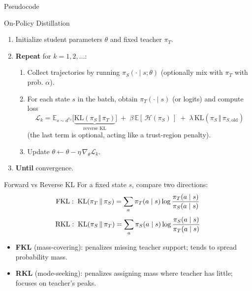 \documentclass[10pt,aspectratio=169]{beamer}
\begin{document}
\begin{frame}{Pseudocode}
\small
\begin{block}{On-Policy Distillation}
\begin{enumerate}
  \item Initialize student parameters $\theta$ and fixed teacher $\pi_T$.
  \item \textbf{Repeat} for $k=1,2,\dots$:
  \begin{enumerate}
    \item Collect trajectories by running $\pi_S(\cdot\mid s;\theta)$ (optionally mix with $\pi_T$ with prob. $\alpha$).
    \item For each state $s$ in the batch, obtain $\pi_T(\cdot\mid s)$ (or logits) and compute loss
    \[
      \mathcal{L}_k = \mathbb{E}_{s\sim d^{\pi_S}}\big[\underbrace{\mathrm{KL}(\pi_S\,\Vert\,\pi_T)}_{\text{reverse KL}}\big]
      \; + \; \beta\,\mathbb{E}[\,\mathcal{H}(\pi_S)\,] \; + \; \lambda\,\mathrm{KL}(\pi_S\,\Vert\,\pi_{S,\text{old}})
    \]
    (the last term is optional, acting like a trust-region penalty).
    \item Update $\theta \leftarrow \theta - \eta\,\nabla_\theta \mathcal{L}_k$.
  \end{enumerate}
  \item \textbf{Until} convergence.
\end{enumerate}
\end{block}
\end{frame}

\begin{frame}{Forward vs Reverse KL}
  For a fixed state $s$, compare two directions:
  \[\small
    \mathrm{FKL}:\; \mathrm{KL}(\pi_T\,\Vert\,\pi_S) 
    = \sum_a \pi_T(a\mid s)\log\frac{\pi_T(a\mid s)}{\pi_S(a\mid s)}
  \]
  \[\small
    \mathrm{RKL}:\; \mathrm{KL}(\pi_S\,\Vert\,\pi_T) 
    = \sum_a \pi_S(a\mid s)\log\frac{\pi_S(a\mid s)}{\pi_T(a\mid s)}
  \]
  \vspace{1mm}
  \begin{itemize}
    \item \textbf{FKL} (mass-covering): penalizes missing teacher support; tends to spread probability mass.
    \item \textbf{RKL} (mode-seeking): penalizes assigning mass where teacher has little; focuses on teacher’s peaks.
  \end{itemize}
\end{frame}
\end{document}
